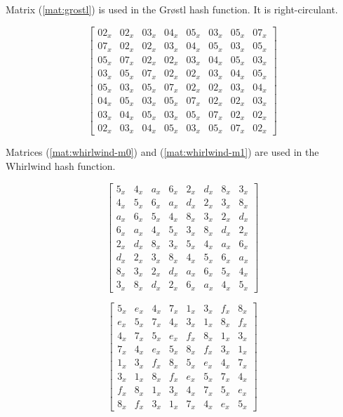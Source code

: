 \documentclass{report}
\begin{document}
Matrix (\ref{mat:grostl}) is used in the Gr{\o}stl hash function. It is right-circulant.

\begin{equation}\label{mat:grostl}
\begin{bmatrix}
02_x & 02_x & 03_x & 04_x & 05_x & 03_x & 05_x & 07_x\\
07_x & 02_x & 02_x & 03_x & 04_x & 05_x & 03_x & 05_x\\
05_x & 07_x & 02_x & 02_x & 03_x & 04_x & 05_x & 03_x\\
03_x & 05_x & 07_x & 02_x & 02_x & 03_x & 04_x & 05_x\\
05_x & 03_x & 05_x & 07_x & 02_x & 02_x & 03_x & 04_x\\
04_x & 05_x & 03_x & 05_x & 07_x & 02_x & 02_x & 03_x\\
03_x & 04_x & 05_x & 03_x & 05_x & 07_x & 02_x & 02_x\\
02_x & 03_x & 04_x & 05_x & 03_x & 05_x & 07_x & 02_x
\end{bmatrix}
\end{equation}

Matrices (\ref{mat:whirlwind-m0}) and (\ref{mat:whirlwind-m1}) are used in the Whirlwind hash function.

\begin{equation}\label{mat:whirlwind-m0}
\begin{bmatrix}
5_x & 4_x & a_x & 6_x & 2_x & d_x & 8_x & 3_x\\
4_x & 5_x & 6_x & a_x & d_x & 2_x & 3_x & 8_x\\
a_x & 6_x & 5_x & 4_x & 8_x & 3_x & 2_x & d_x\\
6_x & a_x & 4_x & 5_x & 3_x & 8_x & d_x & 2_x\\
2_x & d_x & 8_x & 3_x & 5_x & 4_x & a_x & 6_x\\
d_x & 2_x & 3_x & 8_x & 4_x & 5_x & 6_x & a_x\\
8_x & 3_x & 2_x & d_x & a_x & 6_x & 5_x & 4_x\\
3_x & 8_x & d_x & 2_x & 6_x & a_x & 4_x & 5_x
\end{bmatrix}
\end{equation}

\begin{equation}\label{mat:whirlwind-m1}
\begin{bmatrix}
5_x & e_x & 4_x & 7_x & 1_x & 3_x & f_x & 8_x\\
e_x & 5_x & 7_x & 4_x & 3_x & 1_x & 8_x & f_x\\
4_x & 7_x & 5_x & e_x & f_x & 8_x & 1_x & 3_x\\
7_x & 4_x & e_x & 5_x & 8_x & f_x & 3_x & 1_x\\
1_x & 3_x & f_x & 8_x & 5_x & e_x & 4_x & 7_x\\
3_x & 1_x & 8_x & f_x & e_x & 5_x & 7_x & 4_x\\
f_x & 8_x & 1_x & 3_x & 4_x & 7_x & 5_x & e_x\\
8_x & f_x & 3_x & 1_x & 7_x & 4_x & e_x & 5_x
\end{bmatrix}
\end{equation}
\end{document}
